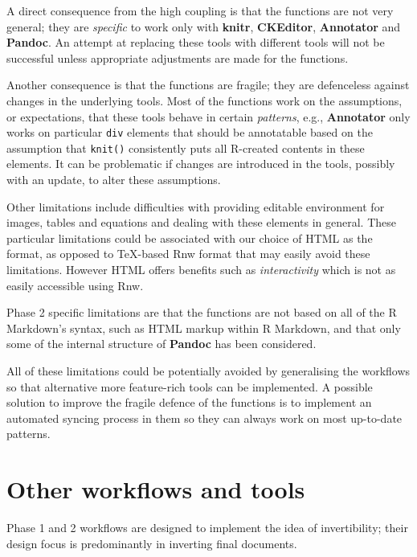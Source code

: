 \documentclass[a4paper, 12pt]{report}
\begin{document}
A direct consequence from the high coupling is that the functions are not very general; they are \emph{specific} to work only with \textbf{knitr}, \textbf{CKEditor}, \textbf{Annotator} and \textbf{Pandoc}. An attempt at replacing these tools with different tools will not be successful unless appropriate adjustments are made for the functions.

Another consequence is that the functions are fragile; they are defenceless against changes in the underlying tools. Most of the functions work on the assumptions, or expectations, that these tools behave in certain \emph{patterns}, e.g., \textbf{Annotator} only works on particular \texttt{div} elements that should be annotatable based on the assumption that \texttt{knit()} consistently puts all R-created contents in these elements. It can be problematic if changes are introduced in the tools, possibly with an update, to alter these assumptions.

Other limitations include difficulties with providing editable environment for images, tables and equations and dealing with these elements in general. These particular limitations could be associated with our choice of HTML as the format, as opposed to TeX-based Rnw format that may easily avoid these limitations. However HTML offers benefits such as \emph{interactivity} which is not as easily accessible using Rnw.

Phase 2 specific limitations are that the functions are not based on all of the R Markdown's syntax, such as HTML markup within R Markdown, and that only some of the internal structure of \textbf{Pandoc} has been considered.

All of these limitations could be potentially avoided by generalising the workflows so that alternative more feature-rich tools can be implemented. A possible solution to improve the fragile defence of the functions is to implement an automated syncing process in them so they can always work on most up-to-date patterns.


\section*{Other workflows and tools}
Phase 1 and 2 workflows are designed to implement the idea of invertibility; their design focus is predominantly in inverting final documents.
\end{document}
